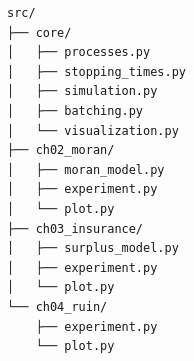 \documentclass[varwidth=\maxdimen,border=6pt]{standalone}
\begin{document}
\begin{verbatim}
src/
├── core/
│   ├── processes.py
│   ├── stopping_times.py
│   ├── simulation.py
│   ├── batching.py
│   └── visualization.py
├── ch02_moran/
│   ├── moran_model.py
│   ├── experiment.py
│   └── plot.py
├── ch03_insurance/
│   ├── surplus_model.py
│   ├── experiment.py
│   └── plot.py
└── ch04_ruin/
    ├── experiment.py
    └── plot.py
\end{verbatim}
\end{document}
